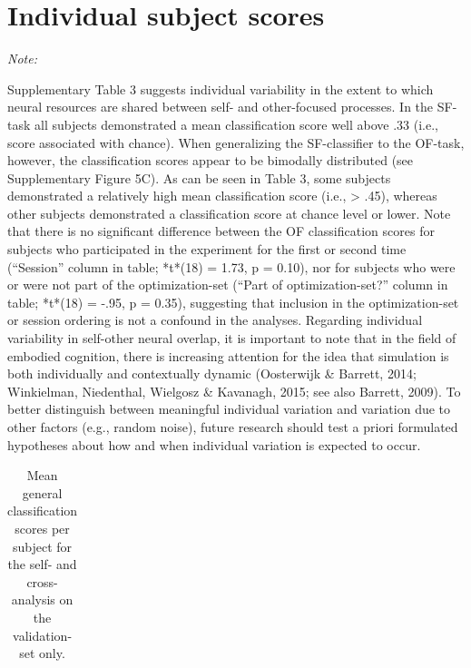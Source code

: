 \documentclass[12pt,american,a4paper,oneside,]{memoir} %
\begin{document}
\newpage
\pagestyle{empty}

\hypertarget{individual-subject-scores}{%
\section{Individual subject scores}\label{individual-subject-scores}}

\begingroup\fontsize{10}{12}\selectfont

\begin{ThreePartTable}
\begin{TableNotes}[para]
\item \textit{Note: } 
\item Supplementary Table 3 suggests individual variability in the extent to which neural resources are shared between self- and other-focused processes. In the SF-task all subjects demonstrated a mean classification score well above .33 (i.e., score associated with chance). When generalizing the SF-classifier to the OF-task, however, the classification scores appear to be bimodally distributed (see Supplementary Figure 5C). As can be seen in Table 3, some subjects demonstrated a relatively high mean classification score (i.e., > .45), whereas other subjects demonstrated a classification score at chance level or lower. Note that there is no significant difference between the OF classification scores for subjects who participated in the experiment for the first or second time (“Session” column in table; *t*(18) = 1.73, p = 0.10), nor for subjects who were or were not part of the optimization-set (“Part of optimization-set?” column in table; *t*(18) = -.95, p = 0.35), suggesting that inclusion in the optimization-set or session ordering is not a confound in the analyses. Regarding individual variability in self-other neural overlap, it is important to note that in the field of embodied cognition, there is increasing attention for the idea that simulation is both individually and contextually dynamic (Oosterwijk \& Barrett, 2014; Winkielman, Niedenthal, Wielgosz \& Kavanagh, 2015; see also Barrett, 2009). To better distinguish between meaningful individual variation and variation due to other factors (e.g., random noise), future research should test a priori formulated hypotheses about how and when individual variation is expected to occur. 
\end{TableNotes}
\begin{longtabu} to 
\caption{\label{tab:tab-shared-states-S3}Mean general classification scores per subject for the self- and cross-analysis on the validation-set only.}\\

\end{longtabu}
\end{ThreePartTable}
\end{document}
